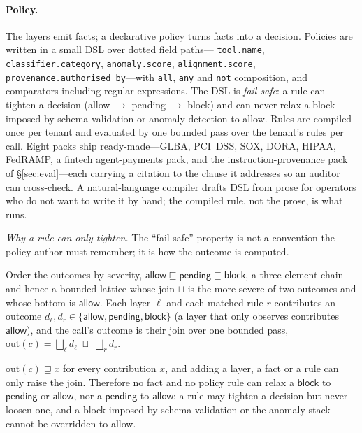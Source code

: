 \documentclass[sigconf,nonacm]{acmart}
\begin{document}
\paragraph{Policy.}
\begin{sloppypar}
The layers emit facts; a declarative policy turns facts into a decision.
Policies are written in a small DSL over dotted field paths---
\texttt{tool.name}, \texttt{classifier.\allowbreak category}, \texttt{anomaly.score}, \texttt{alignment.score},
\texttt{provenance.\allowbreak authorised\_by}---\allowbreak with \texttt{all}, \texttt{any} and
\texttt{not} composition, and comparators including regular expressions.
The DSL is \emph{fail-safe}: a rule can tighten a decision (allow $\to$
pending $\to$ block) and can never relax a block imposed by schema
validation or anomaly detection to allow. Rules are compiled once per
tenant and evaluated by one bounded pass over the tenant's rules per call. Eight packs ship
ready-made---GLBA, PCI~DSS, SOX, DORA, HIPAA, FedRAMP, a fintech
agent-payments pack, and the instruction-provenance pack of
\S\ref{sec:eval}---each carrying a citation to the clause it addresses so
an auditor can cross-check. A natural-language compiler drafts DSL from
prose for operators who do not want to write it by hand; the compiled
rule, not the prose, is what runs.
\end{sloppypar}

\noindent\emph{Why a rule can only tighten.} The ``fail-safe'' property is
not a convention the policy author must remember; it is how the outcome is
computed.

\begin{definition}
\label{def:lattice}
Order the outcomes by severity,
$\mathsf{allow}\sqsubseteq\mathsf{pending}\sqsubseteq\mathsf{block}$, a
three-element chain and hence a bounded lattice whose join
$\sqcup$ is the more severe of two outcomes and whose bottom is
$\mathsf{allow}$. Each layer $\ell$ and each matched rule $r$ contributes
an outcome $d_\ell,d_r\in\{\mathsf{allow},\mathsf{pending},\mathsf{block}\}$
(a layer that only observes contributes $\mathsf{allow}$), and the call's
outcome is their join over one bounded pass,
$\mathrm{out}(c)=\bigsqcup_{\ell} d_\ell \;\sqcup\; \bigsqcup_{r} d_r$.
\end{definition}

\begin{proposition}
\label{prop:failsafe}
$\mathrm{out}(c)\sqsupseteq x$ for every contribution $x$, and adding a
layer, a fact or a rule can only raise the join. Therefore no fact and no
policy rule can relax a $\mathsf{block}$ to $\mathsf{pending}$ or
$\mathsf{allow}$, nor a $\mathsf{pending}$ to $\mathsf{allow}$: a rule may
tighten a decision but never loosen one, and a block imposed by schema
validation or the anomaly stack cannot be overridden to allow.
\end{proposition}
\end{document}
